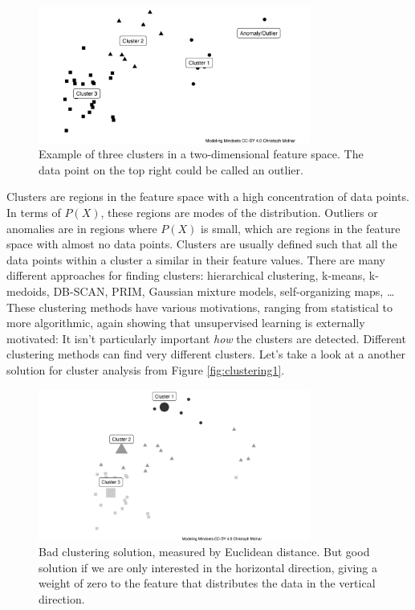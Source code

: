 \documentclass[
  10pt,
]{scrbook}
\begin{document}
\begin{figure}

{\centering \includegraphics[width=0.8\textwidth]{figures/clustering-1} 

}

\caption{Example of three clusters in a two-dimensional feature space. The data point on the top right could be called an outlier.}\label{fig:clustering}
\end{figure}

Clusters are regions in the feature space with a high concentration of data points.
In terms of \(P(X)\), these regions are modes of the distribution.
Outliers or anomalies are in regions where \(P(X)\) is small, which are regions in the feature space with almost no data points.
Clusters are usually defined such that all the data points within a cluster a similar in their feature values.
There are many different approaches for finding clusters: hierarchical clustering, k-means, k-medoids, DB-SCAN, PRIM, Gaussian mixture models, self-organizing maps, \ldots{}
These clustering methods have various motivations, ranging from statistical to more algorithmic, again showing that unsupervised learning is externally motivated:
It isn't particularly important \emph{how} the clusters are detected.
Different clustering methods can find very different clusters.
Let's take a look at a another solution for cluster analysis from Figure \ref{fig:clustering1}.

\begin{figure}

{\centering \includegraphics[width=0.8\textwidth]{figures/clustering2-1} 

}

\caption{Bad clustering solution, measured by Euclidean distance. But good solution if we are only interested in the horizontal direction, giving a weight of zero to the feature that distributes the data in the vertical direction.}\label{fig:clustering2}
\end{figure}
\end{document}
